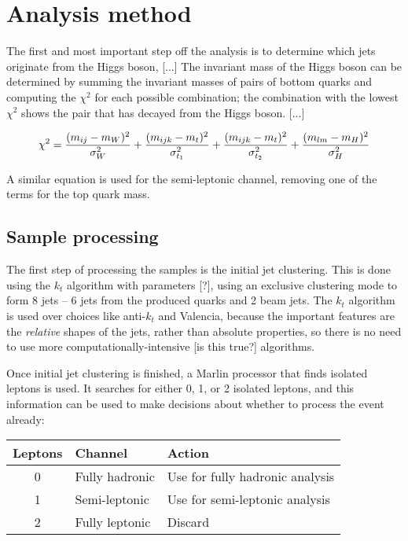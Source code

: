 \section{Analysis method}
The first and most important step off the analysis is to determine which jets originate from the Higgs boson, [...] The invariant mass of the Higgs boson can be determined by summing the invariant masses of pairs of bottom quarks and computing the $\chi^2$ for each possible combination; the combination with the lowest $\chi^2$ shows the pair that has decayed from the Higgs boson. [...]

\begin{equation}
  \centering
	\chi^2 = \frac{(m_{ij} - m_W)^2}{\sigma^2_W} + \frac{(m_{ijk} - m_t)^2}{\sigma^2_{t_1}} + \frac{(m_{ijk} - m_t)^2}{\sigma^2_{t_2}} + \frac{(m_{lm} - m_H)^2}{\sigma^2_H}
\label{eq:chi-square}
\end{equation}

A similar equation is used for the semi-leptonic channel, removing one of the terms for the top quark mass.

\subsection{Sample processing}
The first step of processing the samples is the initial jet clustering. This is done using the $k_t$ algorithm with parameters [?], using an exclusive clustering mode to form 8 jets -- 6 jets from the produced quarks and 2 beam jets. The $k_t$ algorithm is used over choices like anti-$k_t$ and Valencia, because the important features are the \emph{relative} shapes of the jets, rather than absolute properties, so there is no need to use more computationally-intensive [is this true?] algorithms.

Once initial jet clustering is finished, a Marlin processor that finds isolated leptons is used. It searches for either 0, 1, or 2 isolated leptons, and this information can be used to make decisions about whether to process the event already:

\begin{table}[htp]
\centering
	\begin{tabular}{ | c | l | l | }
	\hline
	Leptons & Channel & Action \\ \hline
	0 & Fully hadronic & Use for fully hadronic analysis \\ \hline
	1 & Semi-leptonic & Use for semi-leptonic analysis \\ \hline
	2 & Fully leptonic & Discard \\ \hline
	\end{tabular}
\end{table}

